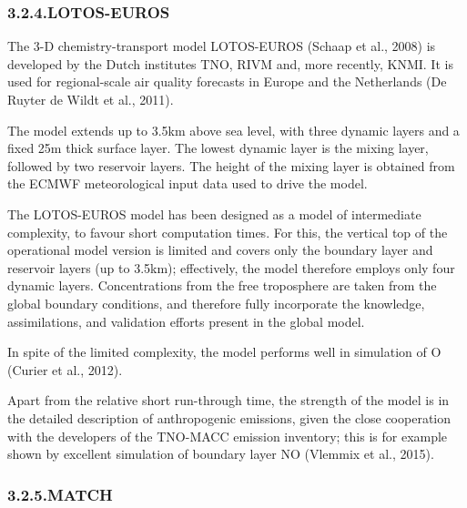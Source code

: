 \documentclass[9pt]{report}
\begin{document}
\subsubsection{3.2.4.\hspace*{0.5em}LOTOS-EUROS}\label{sec-lotos-euros}%

\noindent{}The 3-D chemistry-transport model LOTOS-EUROS (Schaap et al., 2008) is developed by the Dutch institutes TNO, RIVM and, more recently, KNMI.
It is used for regional-scale air quality forecasts in Europe and the Netherlands (De Ruyter de Wildt et al., 2011).%

The model extends up to 3.5km above sea level, with three dynamic layers and a ﬁxed 25m thick surface layer. 
The lowest dynamic layer is the mixing layer, followed by two reservoir layers. 
The height of the mixing layer is obtained from the ECMWF meteorological input data used to drive the model.%

The LOTOS-EUROS model has been designed as a model of intermediate complexity, to favour short computation times. 
For this, the vertical top of the operational model version is limited and covers only the boundary layer and reservoir layers (up to 3.5km); effectively, the model therefore employs only four dynamic layers. 
Concentrations from the free troposphere are taken from the global boundary conditions, and therefore fully incorporate the knowledge, assimilations, and validation efforts present in the global model.%

In spite of the limited complexity, the model performs well in simulation of O (Curier et al., 2012).%

Apart from the relative short run-through time, the strength of the model is in the detailed description of anthropogenic emissions, given the close cooperation with the developers of the TNO-MACC emission inventory; this is for example shown by excellent simulation of boundary layer NO (Vlemmix et al., 2015).%

\subsubsection{3.2.5.\hspace*{0.5em}MATCH}\label{sec-match}%
\end{document}
